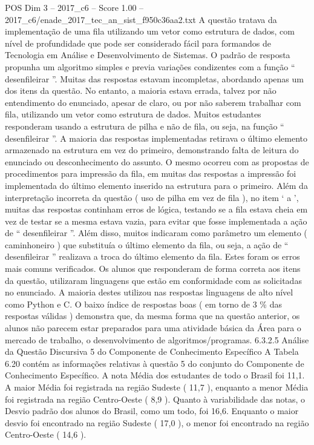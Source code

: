 \begin{textsample}{POS Dim 3 – 2017\_c6 – Score 1.00 – 2017\_c6/enade\_2017\_tec\_an\_sist\_f950c36aa2.txt}
A questão tratava da implementação de uma fila utilizando um vetor como estrutura de dados, com nível de profundidade que pode ser considerado fácil para formandos de Tecnologia em Análise e Desenvolvimento de Sistemas.
O padrão de resposta propunha um algoritmo simples e previa variações condizentes com a função “ desenfileirar ”.
Muitas das respostas estavam incompletas, abordando apenas um dos itens da questão.
No entanto, a maioria estava errada, talvez por não entendimento do enunciado, apesar de claro, ou por não saberem trabalhar com fila, utilizando um vetor como estrutura de dados.
Muitos estudantes responderam usando a estrutura de pilha e não de fila, ou seja, na função “ desenfileirar ”.
A maioria das respostas implementadas retirava o último elemento armazenado na estrutura em vez do primeiro, demonstrando falta de leitura do enunciado ou desconhecimento do assunto.
O mesmo ocorreu com as propostas de procedimentos para impressão da fila, em muitas das respostas a impressão foi implementada do último elemento inserido na estrutura para o primeiro.
Além da interpretação incorreta da questão ( uso de pilha em vez de fila ), no item ‘ a ’, muitas das respostas continham erros de lógica, testando se a fila estava cheia em vez de testar se a mesma estava vazia, para evitar que fosse implementada a ação de “ desenfileirar ”.
Além disso, muitos indicaram como parâmetro um elemento ( caminhoneiro ) que substituía o último elemento da fila, ou seja, a ação de “ desenfileirar ” realizava a troca do último elemento da fila.
Estes foram os erros mais comuns verificados.
Os alunos que responderam de forma correta aos itens da questão, utilizaram linguagens que estão em conformidade com as solicitadas no enunciado.
A maioria destes utilizou nas respostas linguagens de alto nível como Python e C.
O baixo índice de respostas boas ( em torno de 3 \% das respostas válidas ) demonstra que, da mesma forma que na questão anterior, os alunos não parecem estar preparados para uma atividade básica da Área para o mercado de trabalho, o desenvolvimento de algoritmos/programas. 6.3.2.5 Análise da Questão Discursiva 5 do Componente de Conhecimento Específico A Tabela 6.20 contém as informações relativas à questão 5 do conjunto do Componente de Conhecimento Específico.
A nota Média dos estudantes de todo o Brasil foi 11,1.
A maior Média foi registrada na região Sudeste ( 11,7 ), enquanto a menor Média foi registrada na região Centro-Oeste ( 8,9 ).
Quanto à variabilidade das notas, o Desvio padrão dos alunos do Brasil, como um todo, foi 16,6.
Enquanto o maior desvio foi encontrado na região Sudeste ( 17,0 ), o menor foi encontrado na região Centro-Oeste ( 14,6 ).

\end{textsample}
